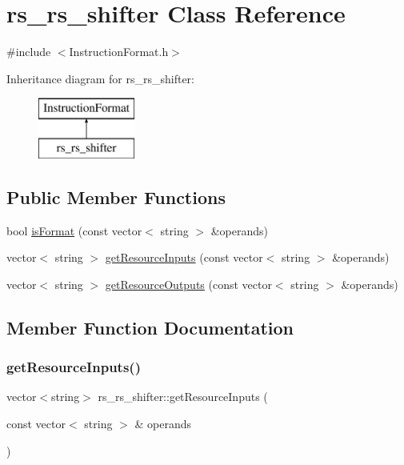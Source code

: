 \hypertarget{classrs__rs__shifter}{}\section{rs\+\_\+rs\+\_\+shifter Class Reference}
\label{classrs__rs__shifter}


{\ttfamily \#include $<$Instruction\+Format.\+h$>$}

Inheritance diagram for rs\+\_\+rs\+\_\+shifter\+:\begin{figure}[H]
\begin{center}
\leavevmode
\includegraphics[height=2.000000cm]{classrs__rs__shifter}
\end{center}
\end{figure}
\subsection*{Public Member Functions}
\begin{DoxyCompactItemize}
\item 
bool \hyperlink{classrs__rs__shifter_a0d8deef39f7613736c69008bedfb0265}{is\+Format} (const vector$<$ string $>$ \&operands)
\item 
vector$<$ string $>$ \hyperlink{classrs__rs__shifter_aa4407b74c1d13c32743e484733efc95d}{get\+Resource\+Inputs} (const vector$<$ string $>$ \&operands)
\item 
vector$<$ string $>$ \hyperlink{classrs__rs__shifter_a1f34f4ebe7ad98f670811d9a43629fdb}{get\+Resource\+Outputs} (const vector$<$ string $>$ \&operands)
\end{DoxyCompactItemize}


\subsection{Member Function Documentation}
\mbox{\label{classrs__rs__shifter_aa4407b74c1d13c32743e484733efc95d}} 
\subsubsection{\texorpdfstring{get\+Resource\+Inputs()}{getResourceInputs()}}
{\footnotesize\ttfamily vector$<$string$>$ rs\+\_\+rs\+\_\+shifter\+::get\+Resource\+Inputs (\begin{DoxyParamCaption}\item[{const vector$<$ string $>$ \&}]{operands }\end{DoxyParamCaption})\hspace{0.3cm}{\ttfamily [virtual]}}

